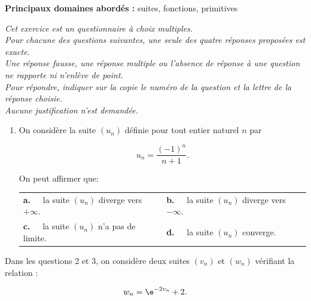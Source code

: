 \textbf{Principaux domaines abordés :} suites, fonctions, primitives

\medskip

\emph{Cet exercice est un questionnaire à choix multiples.\\
Pour chacune des questions suivantes, une seule des quatre réponses proposées est exacte.\\
Une réponse fausse, une réponse multiple ou l'absence de réponse à une question ne rapporte ni n'enlève de point.\\
Pour répondre, indiquer sur la copie le numéro de la question et la lettre de la réponse choisie.\\
Aucune justification n'est demandée.}

\medskip

\begin{enumerate}
\item On considère la suite $\left(u_n\right)$ définie pour tout entier naturel $n$ par

\[u_n  = \dfrac{(- 1)^n}{n + 1}.\]

On peut affirmer que:
\begin{center}
\begin{tabularx}{\linewidth}{X X}
\textbf{a.~~} la suite $\left(u_n\right)$ diverge vers $+\infty$. &\textbf{b.~~} la suite $\left(u_n\right)$ diverge vers $-\infty$.\\
\textbf{c.~~}  la suite $\left(u_n\right)$ n'a pas de limite. &\textbf{d.~~} la suite $\left(u_n\right)$ converge.
\end{tabularx}
\end{center}

\begin{center} \decosix \decosix \decosix  \end{center}
\end{enumerate}

Dans les questions 2 et 3, on considère deux suites $\left(v_n\right)$  et $\left(w_n\right)$ vérifiant la relation : 

\[w_n = \e^{- 2v_n} + 2.\]


